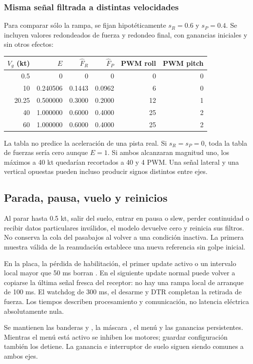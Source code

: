 \subsubsection{Misma señal filtrada a distintas velocidades}
Para comparar sólo la rampa, se fijan hipotéticamente $s_R=0.6$ y $s_P=0.4$. Se incluyen valores redondeados de fuerza y redondeo final, con ganancias iniciales y sin otros efectos:
\begin{center}
\begin{tabular}{rrrrrr}
\toprule
$V_g$ (kt) & $E$ & $\widehat F_R$ & $\widehat F_P$ & PWM roll & PWM pitch\\\midrule
0.5 & 0 & 0 & 0 & 0 & 0\\
10 & 0.240506 & 0.1443 & 0.0962 & 6 & 0\\
20.25 & 0.500000 & 0.3000 & 0.2000 & 12 & 1\\
40 & 1.000000 & 0.6000 & 0.4000 & 25 & 2\\
60 & 1.000000 & 0.6000 & 0.4000 & 25 & 2\\
\bottomrule
\end{tabular}
\end{center}
La tabla no predice la aceleración de una pista real. Si $s_R=s_P=0$, toda la tabla de fuerzas sería cero aunque $E=1$. Si ambos alcanzaran magnitud uno, los máximos a 40 kt quedarían recortados a 40 y 4 PWM. Una señal lateral y una vertical opuestas pueden incluso producir signos distintos entre ejes.

\subsection{Parada, pausa, vuelo y reinicios}
Al parar hasta 0.5 kt, salir del suelo, entrar en pausa o slew, perder continuidad o recibir datos particulares inválidos, el modelo devuelve cero y reinicia sus filtros. No conserva la cola del pasabajos al volver a una condición inactiva. La primera muestra válida de la reanudación establece una nueva referencia sin golpe inicial.

En la placa, la pérdida de habilitación, el primer update activo o un intervalo local mayor que 50 ms borran . En el siguiente update normal puede volver a copiarse la última señal fresca del receptor: no hay una rampa local de arranque de 100 ms. El watchdog de 300 ms, el desarme y DTR completan la retirada de fuerza. Los tiempos describen procesamiento y comunicación, no latencia eléctrica absolutamente nula.

Se mantienen las banderas  y , la máscara , el menú y las ganancias persistentes. Mientras el menú está activo se inhiben los motores; guardar configuración también los detiene. La ganancia e interruptor de suelo siguen siendo comunes a ambos ejes.

